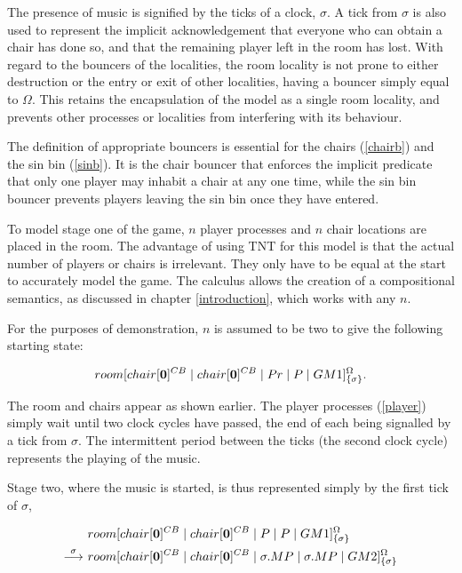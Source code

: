 The presence of music is signified by the ticks of a clock, $\sigma$.  A
tick from $\sigma$ is also used to represent the implicit
acknowledgement that everyone who can obtain a chair has done so, and
that the remaining player left in the room has lost.  With regard to the
bouncers of the localities, the room locality is not prone to either
destruction or the entry or exit of other localities, having a bouncer
simply equal to $\Omega$.  This retains the encapsulation of the model
as a single room locality, and prevents other processes or localities
from interfering with its behaviour.

The definition of appropriate bouncers is essential for the chairs
(\ref{chairb}) and the sin bin (\ref{sinb}).  It is the chair bouncer
that enforces the implicit predicate that only one player may inhabit a
chair at any one time, while the sin bin bouncer prevents players
leaving the sin bin once they have entered.

To model stage one of the game, $n$ player processes and $n$ chair
locations are placed in the room.  The advantage of using TNT for this
model is that the actual number of players or chairs is irrelevant.
They only have to be equal at the start to accurately model the game.
The calculus allows the creation of a compositional semantics, as
discussed in chapter \ref{introduction}, which works with any $n$.

For the purposes of demonstration, $n$ is assumed to be two to give the
following starting state:

\begin{equation}
  {room}[ {chair}[ \textbf{0} ]^{CB} \;|\; {chair}[ \textbf{0} ]^{CB} \;|\; 
   Pr \;|\; P \;|\; GM1 ]^{\Omega}_{\{\sigma\}}.
\end{equation}

\noindent The room and chairs appear as shown earlier.  The player
processes (\ref{player}) simply wait until two clock
cycles have passed, the end of each being signalled by a tick from
$\sigma$.  The intermittent period between the ticks (the second clock
cycle) represents the playing of the music.  

Stage two, where the music is started, is thus represented simply by the
first tick of $\sigma$,

\begin{equation}
\begin{aligned}
  & {room}[ {chair}[ \textbf{0} ]^{CB} \;|\; {chair}[ \textbf{0} ]^{CB} \;|\; 
   P \;|\; P \;|\;
   GM1 ]^{\Omega}_{\{\sigma\}} \\
 \stackrel{\sigma}{\longrightarrow}\ & {room}[ {chair}[ \textbf{0} ]^{CB} \;|\; {chair}[ \textbf{0} ]^{CB} \;|\; 
   \sigma.MP \;|\; \sigma.MP \;|\;
   GM2 ]^{\Omega}_{\{\sigma\}}
\end{aligned}
\end{equation}

